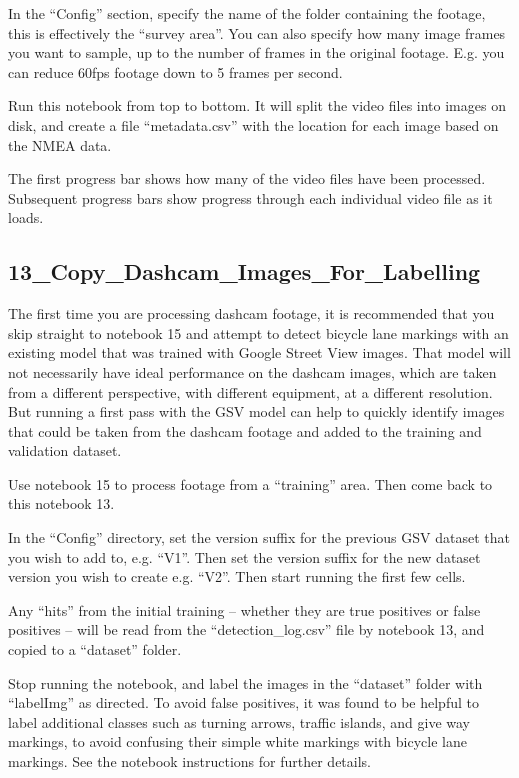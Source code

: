 \documentclass[11pt,twoside]{report}
\begin{document}
In the ``Config'' section, specify the name of the folder containing the footage, this is effectively the ``survey area''.  You can also specify how many image frames you want to sample, up to the number of frames in the original footage.  E.g. you can reduce 60fps footage down to 5 frames per second.

Run this notebook from top to bottom.  It will split the video files into images on disk, and create a file ``metadata.csv'' with the location for each image based on the NMEA data.

The first progress bar shows how many of the video files have been processed.  Subsequent progress bars show progress through each individual video file as it loads.


\subsection{13\_Copy\_Dashcam\_Images\_For\_Labelling}
\label{a13}

The first time you are processing dashcam footage, it is recommended that you skip straight to notebook 15 and attempt to detect bicycle lane markings with an existing model that was trained with Google Street View images.  That model will not necessarily have ideal performance on the dashcam images, which are taken from a different perspective, with different equipment, at a different resolution.  But running a first pass with the GSV model can help to quickly identify images that could be taken from the dashcam footage and added to the training and validation dataset.

Use notebook 15 to process footage from a ``training'' area.  Then come back to this notebook 13.

In the ``Config'' directory, set the version suffix for the previous GSV dataset that you wish to add to, e.g. ``V1''.  Then set the version suffix for the new dataset version you wish to create e.g. ``V2''.  Then start running the first few cells.

Any ``hits'' from the initial training -- whether they are true positives or false positives -- will be read from the ``detection\_log.csv'' file by notebook 13, and copied to a ``dataset'' folder.

Stop running the notebook, and label the images in the ``dataset'' folder with ``labelImg'' as directed.  To avoid false positives, it was found to be helpful to label additional classes such as turning arrows, traffic islands, and give way markings, to avoid confusing their simple white markings with bicycle lane markings.  See the notebook instructions for further details.
\end{document}
